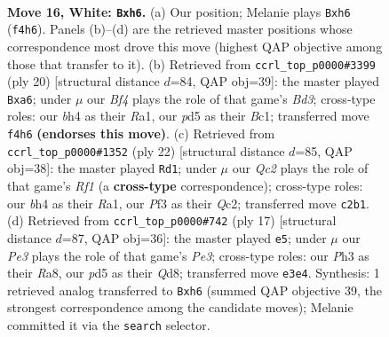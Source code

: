 \documentclass[11pt]{article}
\begin{document}
\clearpage

\begin{figure}[p]\centering
\begin{subfigure}{0.46\textwidth}\centering
\resizebox{\linewidth}{!}{%
\newchessgame
\chessboard[
  setfen={rnbq2k1/pp4pp/2p1r2n/3p1p2/PP1P1B1b/2N1PP1P/2QKN1P1/R4B1R w - - 0 16},
  showmover=false,
  pgfstyle=straightmove, color=movearrow, markmove={f4-h6}
]}
\caption{}
\end{subfigure}\hfill
\begin{subfigure}{0.46\textwidth}\centering
\resizebox{\linewidth}{!}{%
\newchessgame
\chessboard[
  setfen={r1bqr1k1/pp3ppp/n2b1n2/2pp4/3P4/P1NBP3/1PQ1NPPP/R1B2RK1 w - - 0 11},
  showmover=false,
  pgfstyle=straightmove, color=movearrow, markmove={d3-a6}
]}
\caption{}
\end{subfigure}
\\[4pt]
\begin{subfigure}{0.46\textwidth}\centering
\resizebox{\linewidth}{!}{%
\newchessgame
\chessboard[
  setfen={r1bqr1k1/pp3ppp/n2b1n2/2pp4/3P4/P1NBPP2/1PQ1N1PP/R1B2RK1 w - - 0 12},
  showmover=false,
  pgfstyle=straightmove, color=movearrow, markmove={f1-d1}
]}
\caption{}
\end{subfigure}\hfill
\begin{subfigure}{0.46\textwidth}\centering
\resizebox{\linewidth}{!}{%
\newchessgame
\chessboard[
  setfen={r2qkb1r/pp1n1ppp/2p1pn2/7b/2BPP3/P1N2N1P/1P3PP1/R1BQK2R b KQkq - 0 9},
  showmover=false,
  pgfstyle=straightmove, color=movearrow, markmove={e6-e5}
]}
\caption{}
\end{subfigure}
\caption{\textbf{Move 16, White: \texttt{Bxh6}.} (a) Our position; Melanie plays \texttt{Bxh6} (\texttt{f4h6}). Panels (b)--(d) are the retrieved master positions whose correspondence most drove this move (highest QAP objective among those that transfer to it). (b) Retrieved from \texttt{ccrl\_top\_p0000\#3399} (ply 20) [structural distance $d$=84, QAP obj=39]: the master played \texttt{Bxa6}; under $\mu$ our \emph{Bf4} plays the role of that game's \emph{Bd3}; cross-type roles: our \emph{b}h4 as their \emph{R}a1, our \emph{p}d5 as their \emph{B}c1; transferred move \texttt{f4h6} \textbf{(endorses this move)}. (c) Retrieved from \texttt{ccrl\_top\_p0000\#1352} (ply 22) [structural distance $d$=85, QAP obj=38]: the master played \texttt{Rd1}; under $\mu$ our \emph{Qc2} plays the role of that game's \emph{Rf1} (a \textbf{cross-type} correspondence); cross-type roles: our \emph{b}h4 as their \emph{R}a1, our \emph{P}f3 as their \emph{Q}c2; transferred move \texttt{c2b1}. (d) Retrieved from \texttt{ccrl\_top\_p0000\#742} (ply 17) [structural distance $d$=87, QAP obj=36]: the master played \texttt{e5}; under $\mu$ our \emph{Pe3} plays the role of that game's \emph{Pe3}; cross-type roles: our \emph{P}h3 as their \emph{R}a8, our \emph{p}d5 as their \emph{Q}d8; transferred move \texttt{e3e4}. Synthesis: 1 retrieved analog transferred to \texttt{Bxh6} (summed QAP objective 39, the strongest correspondence among the candidate moves); Melanie committed it via the \texttt{search} selector.}
\label{fig:thought-m30}
\end{figure}
\end{document}
